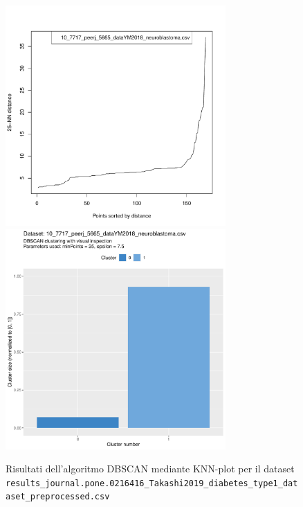 \documentclass[12pt]{report}
\begin{document}
			\begin{figure}[h]
				\centering
				\includegraphics[width = 0.75\textwidth, height = 0.45\textheight, page = 4]{
					doc/DBSCAN_optimal_MinPts.pdf
				}
				\includegraphics[width = 0.75\textwidth, height = 0.45\textheight, page = 4]{
					results/DBSCAN_visual_comparison.pdf
				}
				\caption{Risultati dell'algoritmo DBSCAN mediante KNN-plot per il dataset
				\texttt{results\_journal.pone.0216416\_Takashi2019\_diabetes\_type1\_dataset\_preprocessed.csv}}
				\label{fig:dbscan-extra4}
			\end{figure}
\end{document}
